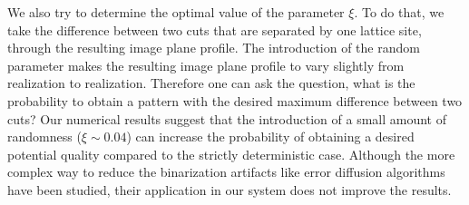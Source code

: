 We also try to determine the optimal value of the parameter $\xi$. To do that, we take the difference between two cuts that are separated by one lattice site, through the resulting image plane profile. The introduction of the random parameter makes the resulting image plane profile to vary slightly from realization to realization. Therefore one can ask the question, what is the probability to obtain a pattern with the desired maximum difference between two cuts? Our numerical results suggest that the introduction of a small amount of randomness ($\xi \sim 0.04$) can increase the probability of obtaining a desired potential quality compared to the strictly deterministic case. Although the more complex way to reduce the binarization artifacts like error diffusion algorithms \cite{floyd, Hu2018} have been studied, their application in our system does not improve the results. 

